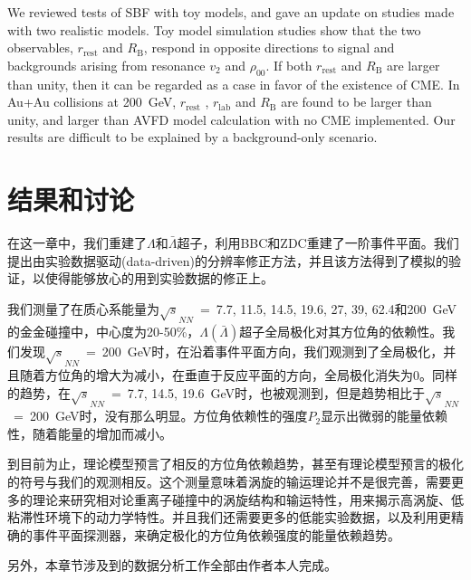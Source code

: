 \vspace{-0.37cm}
\vspace{-0.08cm}

We reviewed tests of SBF with toy models, and gave an update on studies made with two realistic models. 
Toy model simulation studies show that the two observables, $r_{\mathrm{rest}}$ and $R_{\mathrm{B}}$, respond in opposite directions to signal and backgrounds arising from resonance $v_2$ and $\rho _{00}$.  If both  $r_{\mathrm{rest}}$ and $R_{\mathrm{B}}$ are larger than unity, then it can be regarded as a case in favor of the existence of CME. 
In Au+Au collisions at 200~GeV,  $r_{\mathrm{rest}}$ ,  $r_{\mathrm{lab}}$ and $R_{\mathrm{B}}$ are found to be larger than unity, and larger than AVFD model calculation with no CME implemented. Our results are difficult to be explained by a background-only scenario.





\section{结果和讨论}




在这一章中，我们重建了$\Lambda$和$\bar{\Lambda}$超子，利用BBC和ZDC重建了一阶事件平面。我们提出由实验数据驱动(data-driven)的分辨率修正方法，并且该方法得到了模拟的验证，以使得能够放心的用到实验数据的修正上。

我们测量了在质心系能量为$\sqrt{s}_{NN}$~=~7.7, 11.5, 14.5, 19.6, 27, 39, 62.4和200~GeV 的金金碰撞中，中心度为20-50\%，$\Lambda(\bar{\Lambda})$超子全局极化对其方位角的依赖性。我们发现$\sqrt{s}_{NN}$~=~200~GeV时，在沿着事件平面方向，我们观测到了全局极化，并且随着方位角的增大为减小，在垂直于反应平面的方向，全局极化消失为0。同样的趋势，在$\sqrt{s}_{NN}$~=~7.7, 14.5, 19.6~GeV时，也被观测到，但是趋势相比于$\sqrt{s}_{NN}$~=~200~GeV时，没有那么明显。方位角依赖性的强度$P_{2}$显示出微弱的能量依赖性，随着能量的增加而减小。

到目前为止，理论模型预言了相反的方位角依赖趋势，甚至有理论模型预言的极化的符号与我们的观测相反。这个测量意味着涡旋的输运理论并不是很完善，需要更多的理论来研究相对论重离子碰撞中的涡旋结构和输运特性，用来揭示高涡旋、低粘滞性环境下的动力学特性。并且我们还需要更多的低能实验数据，以及利用更精确的事件平面探测器，来确定极化的方位角依赖强度的能量依赖趋势。

另外，本章节涉及到的数据分析工作全部由作者本人完成。



